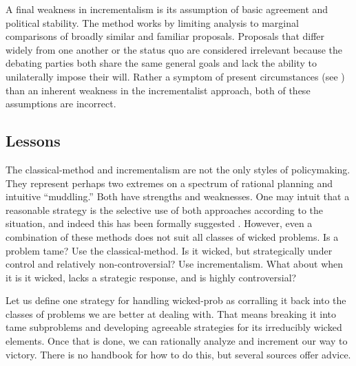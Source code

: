 A final weakness in \ac{incrementalism} is its assumption of basic agreement and political stability. The method works
by limiting analysis to marginal comparisons of broadly similar and familiar proposals. Proposals that differ widely
from one another or the status quo are considered irrelevant because the debating parties both share the same general
goals and lack the ability to unilaterally impose their will. Rather a symptom of present circumstances (see
) than an inherent weakness in the incrementalist approach, both of these assumptions are
incorrect.


\subsection{Lessons}
\label{sec-policy-lessons}

The \ac{classical-method} and \ac{incrementalism} are not the only styles of policymaking. They represent perhaps two
extremes on a spectrum of rational planning and intuitive ``muddling.'' Both have strengths and weaknesses. One may
intuit that a reasonable strategy is the selective use of both approaches according to the situation, and indeed this
has been formally suggested \cite{etzioni_scanning_1967}. However, even a combination of these methods does not suit all
classes of wicked problems. Is a problem tame? Use the \ac{classical-method}. Is it wicked, but strategically under
control and relatively non-controversial? Use \ac{incrementalism}. What about when it is it wicked, lacks a strategic
response, and is highly controversial?

Let us define one strategy for handling \ac{wicked-prob} as corralling it back into the classes of problems we are
better at dealing with. That means breaking it into tame subproblems and developing agreeable strategies for its
irreducibly wicked elements. Once that is done, we can rationally analyze and increment our way to victory. There is no
handbook for how to do this, but several sources offer advice.

\newcommand{\wickedtipsstart}{\begin{itemize}}
\newcommand{\wickedtip}[2]{ %
  \item \textbf{#1} \nopagebreak

  \vspace{0.5\baselineskip} \parbox{\linewidth}{#2} \vspace{0.5\baselineskip}
}
\newcommand{\wickedtipsend}{\end{itemize}}

